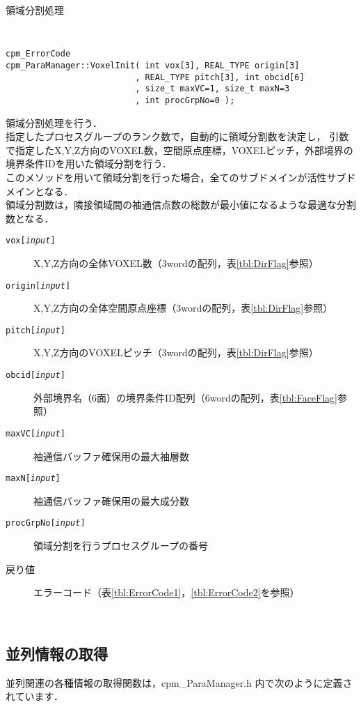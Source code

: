 \begin{spacing}{0.8}
\begin{itembox}[l]{領域分割処理}
{\tt
\begin{verbatim}
cpm_ErrorCode
cpm_ParaManager::VoxelInit( int vox[3], REAL_TYPE origin[3]
                          , REAL_TYPE pitch[3], int obcid[6]
                          , size_t maxVC=1, size_t maxN=3
                          , int procGrpNo=0 );
\end{verbatim}
}
領域分割処理を行う．\\
指定したプロセスグループのランク数で，自動的に領域分割数を決定し，
引数で指定したX,Y,Z方向のVOXEL数，空間原点座標，VOXELピッチ，外部境界の
境界条件IDを用いた領域分割を行う．\\
このメソッドを用いて領域分割を行った場合，全てのサブドメインが活性サブドメインとなる．\\
領域分割数は，隣接領域間の袖通信点数の総数が最小値になるような最適な分割数となる．
\begin{description}
\item[{\tt vox[{\it input}]}] X,Y,Z方向の全体VOXEL数（3wordの配列，表\ref{tbl:DirFlag}参照）
\item[{\tt origin[{\it input}]}] X,Y,Z方向の全体空間原点座標（3wordの配列，表\ref{tbl:DirFlag}参照）
\item[{\tt pitch[{\it input}]}] X,Y,Z方向のVOXELピッチ（3wordの配列，表\ref{tbl:DirFlag}参照）
\item[{\tt obcid[{\it input}]}] 外部境界名（6面）の境界条件ID配列（6wordの配列，表\ref{tbl:FaceFlag}参照）
\item[{\tt maxVC[{\it input}]}] 袖通信バッファ確保用の最大袖層数
\item[{\tt maxN[{\it input}]}] 袖通信バッファ確保用の最大成分数
\item[{\tt procGrpNo[{\it input}]}] 領域分割を行うプロセスグループの番号
\\
\item[戻り値] エラーコード（表\ref{tbl:ErrorCode1}，\ref{tbl:ErrorCode2}を参照）
\end{description}
\end{itembox}\\
\end{spacing}


\clearpage


\subsection{並列情報の取得}
\label{paraInfo}
並列関連の各種情報の取得関数は，cpm\_ParaManager.h 内で次のように定義されています．\\

